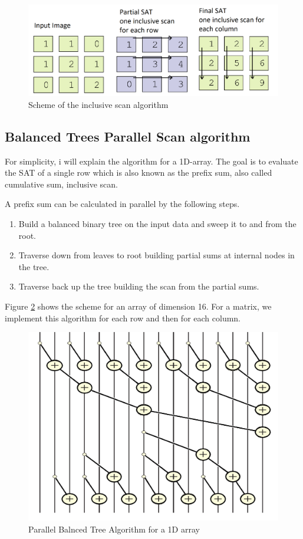    \begin{figure}[h!]
   	\centering
   	\includegraphics[width=\textwidth]{imm/iia/inclusive_scan}  
   	\caption{Scheme of the inclusive scan algorithm} 
   	\label{fig:inclusive_scan}
   \end{figure}
 
 \subsection{Balanced Trees Parallel Scan algorithm}
 For simplicity, i will explain the algorithm for a 1D-array.
 The goal is to evaluate the SAT of a single row which is also known as the prefix sum, also called cumulative sum, inclusive scan. 
 
 A prefix sum can be calculated in parallel by the following steps.

 \begin{enumerate}
 \item Build a balanced binary tree on the input data and sweep it to and from the root. 
 \item Traverse down from leaves to root building partial sums at internal nodes in the tree. 
 \item Traverse back up the tree building the scan from the partial sums.
 \end{enumerate}
 
  
 Figure \ref{fig:Balanced_tree} shows the scheme for an array of dimension 16.
 For a matrix, we implement this algorithm for each row and then for each column.
 
 \begin{figure}[h!]
 	\centering
 	\includegraphics[width=\textwidth]{imm/iia/Balanced_tree0}  
 	\caption{Parallel Balnced Tree Algorithm for a 1D array} 
 	\label{fig:Balanced_tree}
 \end{figure}
 
